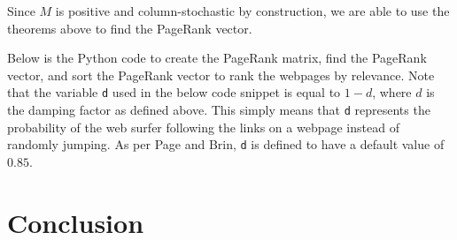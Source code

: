 \documentclass[11pt]{article}
\theoremstyle{definition}
\begin{document}
Since $M$ is positive and column-stochastic by construction, we are able to use the theorems above to find the PageRank vector.

Below is the Python code to create the PageRank matrix, find the PageRank vector, and sort the PageRank vector to rank the webpages by relevance.
Note that the variable \texttt{d} used in the below code snippet is equal to $1-d$, where $d$ is the damping factor as defined above.
This simply means that \texttt{d} represents the probability of the web surfer following the links on a webpage instead of randomly jumping.
As per Page and Brin, \texttt{d} is defined to have a default value of $0.85$.




\section{Conclusion}



\begin{thebibliography}{9}
\bibitem{}

\end{thebibliography}
\end{document}

